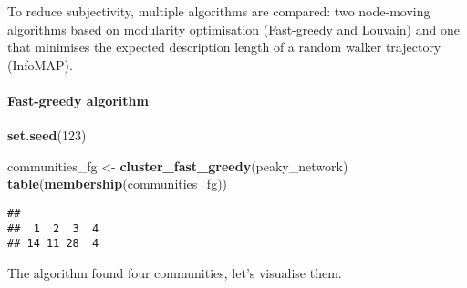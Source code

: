 \documentclass[
]{article}
\newenvironment{Shaded}{\begin{snugshade}}{\end{snugshade}}
\newcommand{\AttributeTok}[1]{\textcolor[rgb]{0.13,0.29,0.53}{#1}}
\newcommand{\ConstantTok}[1]{\textcolor[rgb]{0.56,0.35,0.01}{#1}}
\newcommand{\DecValTok}[1]{\textcolor[rgb]{0.00,0.00,0.81}{#1}}
\newcommand{\FunctionTok}[1]{\textcolor[rgb]{0.13,0.29,0.53}{\textbf{#1}}}
\newcommand{\NormalTok}[1]{#1}
\newcommand{\OtherTok}[1]{\textcolor[rgb]{0.56,0.35,0.01}{#1}}
\newcommand{\SpecialCharTok}[1]{\textcolor[rgb]{0.81,0.36,0.00}{\textbf{#1}}}
\newcommand{\StringTok}[1]{\textcolor[rgb]{0.31,0.60,0.02}{#1}}
\begin{document}
To reduce subjectivity, multiple algorithms are compared: two
node-moving algorithms based on modularity optimisation (Fast-greedy and
Louvain) and one that minimises the expected description length of a
random walker trajectory (InfoMAP).

\hypertarget{fast-greedy-algorithm}{%
\paragraph{Fast-greedy algorithm}\label{fast-greedy-algorithm}}

\begin{Shaded}
\begin{Highlighting}[]
\FunctionTok{set.seed}\NormalTok{(}\DecValTok{123}\NormalTok{)}

\NormalTok{communities\_fg }\OtherTok{\textless{}{-}} \FunctionTok{cluster\_fast\_greedy}\NormalTok{(peaky\_network)}
\FunctionTok{table}\NormalTok{(}\FunctionTok{membership}\NormalTok{(communities\_fg))}
\end{Highlighting}
\end{Shaded}

\begin{verbatim}
## 
##  1  2  3  4 
## 14 11 28  4
\end{verbatim}

The algorithm found four communities, let's visualise them.

\begin{Shaded}
\end{Shaded}
\end{document}
